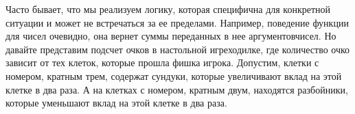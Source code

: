 \documentclass[letterpaper,10pt,russian]{sphinxmanual}
\begin{document}
\sphinxAtStartPar
{}

\sphinxAtStartPar
Часто бывает, что мы реализуем логику, которая специфична для конкретной ситуации и может не встречаться за ее пределами. Например, поведение функции  для чисел очевидно, она вернет суммы переданных в нее аргументов\sphinxhyphen{}чисел. Но давайте представим подсчет очков в настольной игре\sphinxhyphen{}ходилке, где количество очко зависит от тех клеток, которые прошла фишка игрока. Допустим, клетки с номером, кратным трем, содержат сундуки, которые увеличивают вклад на этой клетке в два раза. А на клетках с номером, кратным двум, находятся разбойники, которые уменьшают вклад на этой клетке в два раза.

\begin{sphinxVerbatim}[commandchars=\\\{\}]
 
      

       
             
                
             
                
              

     
\end{sphinxVerbatim}

\sphinxAtStartPar
{}
\end{document}
